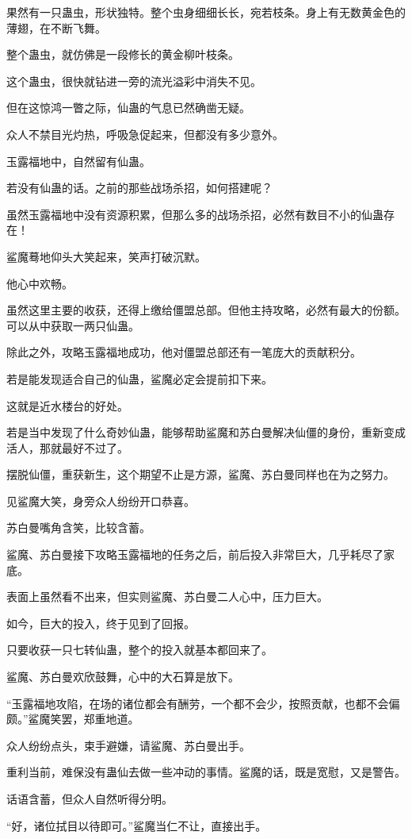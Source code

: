 \begin{this_body}
果然有一只蛊虫，形状独特。整个虫身细细长长，宛若枝条。身上有无数黄金色的薄翅，在不断飞舞。

整个蛊虫，就仿佛是一段修长的黄金柳叶枝条。

这个蛊虫，很快就钻进一旁的流光溢彩中消失不见。

但在这惊鸿一瞥之际，仙蛊的气息已然确凿无疑。

众人不禁目光灼热，呼吸急促起来，但都没有多少意外。

玉露福地中，自然留有仙蛊。

若没有仙蛊的话。之前的那些战场杀招，如何搭建呢？

虽然玉露福地中没有资源积累，但那么多的战场杀招，必然有数目不小的仙蛊存在！

鲨魔蓦地仰头大笑起来，笑声打破沉默。

他心中欢畅。

虽然这里主要的收获，还得上缴给僵盟总部。但他主持攻略，必然有最大的份额。可以从中获取一两只仙蛊。

除此之外，攻略玉露福地成功，他对僵盟总部还有一笔庞大的贡献积分。

若是能发现适合自己的仙蛊，鲨魔必定会提前扣下来。

这就是近水楼台的好处。

若是当中发现了什么奇妙仙蛊，能够帮助鲨魔和苏白曼解决仙僵的身份，重新变成活人，那就最好不过了。

摆脱仙僵，重获新生，这个期望不止是方源，鲨魔、苏白曼同样也在为之努力。

见鲨魔大笑，身旁众人纷纷开口恭喜。

苏白曼嘴角含笑，比较含蓄。

鲨魔、苏白曼接下攻略玉露福地的任务之后，前后投入非常巨大，几乎耗尽了家底。

表面上虽然看不出来，但实则鲨魔、苏白曼二人心中，压力巨大。

如今，巨大的投入，终于见到了回报。

只要收获一只七转仙蛊，整个的投入就基本都回来了。

鲨魔、苏白曼欢欣鼓舞，心中的大石算是放下。

“玉露福地攻陷，在场的诸位都会有酬劳，一个都不会少，按照贡献，也都不会偏颇。”鲨魔笑罢，郑重地道。

众人纷纷点头，束手避嫌，请鲨魔、苏白曼出手。

重利当前，难保没有蛊仙去做一些冲动的事情。鲨魔的话，既是宽慰，又是警告。

话语含蓄，但众人自然听得分明。

“好，诸位拭目以待即可。”鲨魔当仁不让，直接出手。


\end{this_body}
